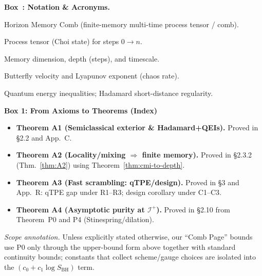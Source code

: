 \documentclass[aps,prd,preprint,onecolumn,superscriptaddress,nofootinbib,longbibliography,floatfix,11pt,showpacs,showkeys]{revtex4-2}
\newcounter{boxedresult}
\newenvironment{boxedresult}[1]{\refstepcounter{boxedresult}\begin{infobox}\noindent\textbf{Box~\theboxedresult: #1.}}{\end{infobox}}
\theoremstyle{plain}
\theoremstyle{definition}
\theoremstyle{remark}
\begin{document}
\begin{boxedresult}{Notation \& Acronyms}
\small
\begin{description}[leftmargin=2.2em,labelsep=0.4em,itemsep=0.2em,topsep=0.2em]
\item[HMC] Horizon Memory Comb (finite-memory multi-time process tensor / comb).
\item[$\Upsilon_{n{:}0}$] Process tensor (Choi state) for steps $0\to n$.
\item[$d_{\rm mem},\,\ell_{\rm mem},\,\tau_{\rm mem}$] Memory dimension, depth (steps), and timescale.
\item[$v_B,\,\lambda_L$] Butterfly velocity and Lyapunov exponent (chaos rate).
\item[QEIs/Hadamard] Quantum energy inequalities; Hadamard short-distance regularity.
\end{description}
\end{boxedresult}
 
\begin{center}
\noindent\textbf{Box 1: From Axioms to Theorems (Index)}\\[2pt]
\begin{itemize}
  \item \textbf{Theorem A1 (Semiclassical exterior \& Hadamard+QEIs).} Proved in \S2.2 and App.~C.
  \item \textbf{Theorem A2 (Locality/mixing $\Rightarrow$ finite memory).} Proved in \S2.3.2 (Thm.~\ref{thm:A2}) using Theorem~\ref{thm:cmi-to-depth}.
  \item \textbf{Theorem A3 (Fast scrambling: qTPE/design).} Proved in \S3 and App.~R: qTPE gap under R1--R3; design corollary under C1--C3.
  \item \textbf{Theorem A4 (Asymptotic purity at $\mathscr I^+$).} Proved in \S2.10 from Theorem~P0 and P4 (Stinespring/dilation).
\end{itemize}
\end{center}%

\noindent\emph{Scope annotation.}
Unless explicitly stated otherwise, our ``Comb Page'' bounds use P0 only through the upper-bound form above together with standard continuity bounds; constants that collect scheme/gauge choices are isolated into the \((c_0+c_1\log S_{\mathrm{BH}})\) term.
\end{document}
